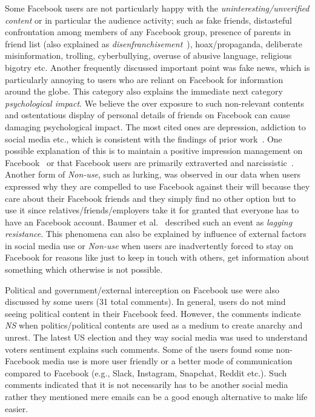 Some Facebook users are not particularly happy with the \textit{uninteresting/unverified content} or in particular the audience activity; such as fake friends, distasteful confrontation among members of any Facebook group, presence of parents in friend list (also explained as \textit{disenfranchisement}~\cite{satchell2009beyond}), hoax/propaganda, deliberate misinformation, trolling, cyberbullying, overuse of abusive language, religious bigotry etc. Another frequently discussed important point was fake news, which is particularly annoying to users who are reliant on Facebook for information around the globe. This category also explains the immediate next category \textit{psychological impact}. We believe the over exposure to such non-relevant contents and ostentatious display of personal details of friends on Facebook can cause damaging psychological impact. The most cited ones are depression, addiction to social media etc., which is consistent with the findings of prior work~\cite{moreno2011feeling, christakis_2017}. One possible explanation of this is to maintain a positive impression management on Facebook~\cite{rosenberg2011online} or that Facebook users are primarily extraverted and narcissistic~\cite{ryan2011uses}. Another form of \textit{Non-use}, such as lurking, was observed in our data when users expressed why they are compelled to use Facebook against their will because they care about their Facebook friends and they simply find no other option but to use it since relatives/friends/employers take it for granted that everyone has to have an Facebook account. Baumer et al.~\cite{baumer2013limiting} described such an event as \textit{lagging resistance}. This phenomena can also be explained by influence of external factors in social media use or \emph{Non-use} when users are inadvertently forced to stay on Facebook for reasons like just to keep in touch with others, get information about something which otherwise is not possible. 

Political and government/external interception on Facebook use were also discussed by some users (31 total comments). In general, users do not mind seeing political content in their Facebook feed. However, the comments indicate \emph{NS} when politics/political contents are used as a medium to create anarchy and unrest. The latest US election and they way social media was used to understand voters sentiment explains such comments. Some of the users found some non-Facebook media use is more user friendly or a better mode of communication compared to Facebook (e.g., Slack, Instagram, Snapchat, Reddit etc.). Such comments indicated that it is not necessarily has to be another social media rather they mentioned mere emails can be a good enough alternative to make life easier. 

